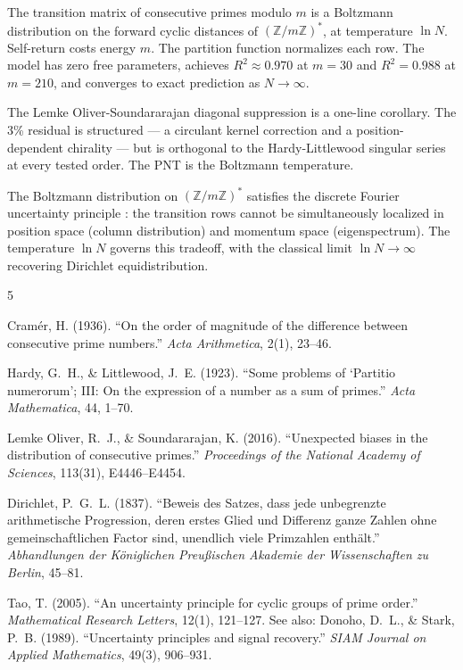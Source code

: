 \documentclass[
  11pt,
]{article}
\begin{document}
The transition matrix of consecutive primes modulo \(m\) is a Boltzmann
distribution on the forward cyclic distances of
\((\mathbb{Z}/m\mathbb{Z})^*\), at temperature \(\ln N\). Self-return
costs energy \(m\). The partition function normalizes each row. The
model has zero free parameters, achieves \(R^2 \approx 0.970\) at
\(m = 30\) and \(R^2 = 0.988\) at \(m = 210\), and converges to exact
prediction as \(N \to \infty\).

The Lemke Oliver-Soundararajan diagonal suppression is a one-line
corollary. The 3\% residual is structured --- a circulant kernel
correction and a position-dependent chirality --- but is orthogonal to
the Hardy-Littlewood singular series at every tested order. The PNT is
the Boltzmann temperature.

The Boltzmann distribution on \((\mathbb{Z}/m\mathbb{Z})^*\) satisfies
the discrete Fourier uncertainty principle \cite{tao}: the transition rows cannot be simultaneously
localized in position space (column distribution) and momentum space
(eigenspectrum). The temperature \(\ln N\) governs this tradeoff, with
the classical limit \(\ln N \to \infty\) recovering Dirichlet
equidistribution.

\begin{thebibliography}{5}

 Cram\'er, H. (1936). ``On the order of magnitude of the difference
between consecutive prime numbers.'' \emph{Acta Arithmetica}, 2(1), 23--46.

 Hardy, G.~H., \& Littlewood, J.~E. (1923). ``Some problems of
`Partitio numerorum'; III: On the expression of a number as a sum of
primes.'' \emph{Acta Mathematica}, 44, 1--70.

 Lemke Oliver, R.~J., \& Soundararajan, K. (2016). ``Unexpected biases
in the distribution of consecutive primes.'' \emph{Proceedings of the
National Academy of Sciences}, 113(31), E4446--E4454.

 Dirichlet, P.~G.~L. (1837). ``Beweis des Satzes, dass jede unbegrenzte
arithmetische Progression, deren erstes Glied und Differenz ganze
Zahlen ohne gemeinschaftlichen Factor sind, unendlich viele Primzahlen
enth\"alt.'' \emph{Abhandlungen der K\"oniglichen Preu\ss ischen Akademie der
Wissenschaften zu Berlin}, 45--81.

 Tao, T. (2005). ``An uncertainty principle for cyclic groups of prime
order.'' \emph{Mathematical Research Letters}, 12(1), 121--127. See
also: Donoho, D.~L., \& Stark, P.~B. (1989). ``Uncertainty principles
and signal recovery.'' \emph{SIAM Journal on Applied Mathematics},
49(3), 906--931.

\end{thebibliography}
\end{document}
